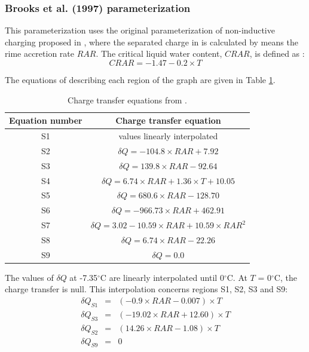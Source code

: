 \subsubsection{Brooks et al. (1997) parameterization}

This parameterization uses the original parameterization of non-inductive charging proposed in \citet{Brooks-1997}, where the separated charge in \citet{Saunders-1991} is calculated by means the rime accretion rate $RAR$.
The critical liquid water content, $CRAR$, is defined as :
\begin{equation}
  CRAR = -1.47 - 0.2 \times T
\end{equation}

\noindent
The equations of \citet{Brooks-1997} describing each region of the graph are given in Table \ref{tab:eq_brook}.
\begin{table}[h]
  \begin{center}
  \begin{tabular}{|c|c|}
    \hline
    Equation number & Charge transfer equation\\
    \hline
    S1 & values linearly interpolated\\
    \hline
    S2 & $\delta Q = -104.8 \times RAR + 7.92$\\
    \hline
    S3 & $\delta Q = 139.8 \times RAR - 92.64$\\
    \hline
    S4 & $\delta Q = 6.74 \times RAR + 1.36 \times T + 10.05$\\
    \hline
    S5 & $\delta Q = 680.6  \times RAR - 128.70$\\
    \hline
    S6 & $\delta Q = -966.73 \times RAR + 462.91$\\
    \hline
    S7 & $\delta Q = 3.02 - 10.59 \times RAR + 10.59 \times RAR^{2}$\\
    \hline
    S8 & $\delta Q = 6.74 \times RAR - 22.26$\\
    \hline
    S9 & $\delta Q = 0.0$\\
    \hline
  \end{tabular}
  \end{center}
  \caption{\small Charge transfer equations from \citet{Brooks-1997}.}
  \label{tab:eq_brook}
\end{table}

The values of $\delta Q$ at -7.35$^{\circ}$C are linearly interpolated until 0$^{\circ}$C.
At $T$ = 0$^{\circ}$C, the charge transfer is null.
This interpolation concerns regions S1, S2, S3 and S9:
\begin{equation}
  \begin{array}{lcl}
    \delta Q_{S1} & = & (-0.9 \times RAR - 0.007) \times T \\
    \delta Q_{S3} & = & (-19.02 \times RAR + 12.60) \times T \\
    \delta Q_{S2} & = & (14.26 \times RAR - 1.08) \times T \\
    \delta Q_{S9} & = & 0
  \end{array}
\end{equation}

